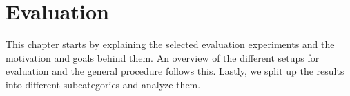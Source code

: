 \chapter{Evaluation}\label{chapter:evaluation}

This chapter starts by explaining the selected evaluation experiments and the motivation and goals behind them.
An overview of the different setups for evaluation and the general procedure follows this.
Lastly, we split up the results into different subcategories and analyze them.





